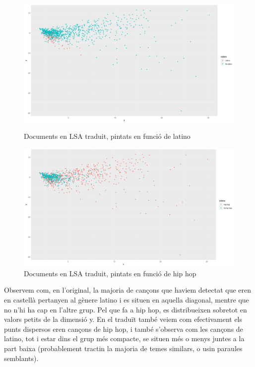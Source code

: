 \begin{figure}[H]
\centering
    \begin{minipage}{.5\textwidth}
        \centering
        \includegraphics[width=0.95\linewidth]{Images//8_Textual//LSA/distances_latino.png}
    \caption{Documents en LSA traduit, pintats en funció de latino}
    \label{fig:textual_lsa_trad_latino}
    \end{minipage}%
    \begin{minipage}{.5\textwidth}
        \centering
        \includegraphics[width=0.95\linewidth]{Images//8_Textual//LSA/distances_hip_hop.png}
    \caption{Documents en LSA traduit, pintats en funció de hip hop}
    \label{fig:textual_lsa_trad_hiphop}
    \end{minipage}%
\end{figure}

Observem com, en l'original, la majoria de cançons que haviem detectat que eren en castellà pertanyen al gènere latino i es situen en aquella diagonal, mentre que no n'hi ha cap en l'altre grup. Pel que fa a hip hop, es distribueixen sobretot en valors petits de la dimensió y. En el traduït també veiem com efectivament els punts dispersos eren cançons de hip hop, i també s'observa com les cançons de latino, tot i estar dins el grup més compacte, se situen més o menys juntes a la part baixa (probablement tractin la majoria de temes similars, o usin paraules semblants).

